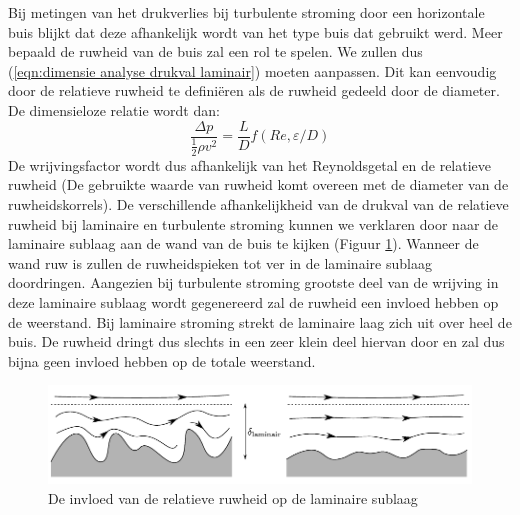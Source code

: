 Bij metingen van het drukverlies bij turbulente stroming door een horizontale buis blijkt dat deze afhankelijk wordt van het type buis dat gebruikt werd. Meer bepaald de ruwheid van de buis zal een rol te spelen. We zullen dus (\ref{eqn:dimensie analyse drukval laminair}) moeten aanpassen. Dit kan eenvoudig door de relatieve ruwheid te definiëren als de ruwheid gedeeld door de diameter. De dimensieloze relatie wordt dan:
\begin{equation}
	\frac{\Delta p}{\frac{1}{2}\rho v^2} = \frac{L}{D} f(Re,\varepsilon/D)
	\label{eqn:dimensie analyse drukval turbulent}
\end{equation}
De wrijvingsfactor wordt dus afhankelijk van het Reynoldsgetal en de relatieve ruwheid (De gebruikte waarde van ruwheid komt overeen met de diameter van de ruwheidskorrels). De verschillende afhankelijkheid van de drukval van de relatieve ruwheid bij laminaire en turbulente stroming kunnen we verklaren door naar de laminaire sublaag aan de wand van de buis te kijken (Figuur \ref{fig:Invloed_ruwheid}). Wanneer de wand ruw is zullen de ruwheidspieken tot ver in de laminaire sublaag doordringen. Aangezien bij turbulente stroming grootste deel van de wrijving in deze laminaire sublaag wordt gegenereerd zal de ruwheid een invloed hebben op de weerstand. Bij laminaire stroming strekt de laminaire laag zich uit over heel de buis. De ruwheid dringt dus slechts in een zeer klein deel hiervan door en zal dus bijna geen invloed hebben op de totale weerstand.
\begin{figure}[htb]
	\centering
	\includegraphics{fig/inwendige_stroming/Invloed_ruwheid}
	\caption{De invloed van de relatieve ruwheid op de laminaire sublaag}
	\label{fig:Invloed_ruwheid}
\end{figure}

